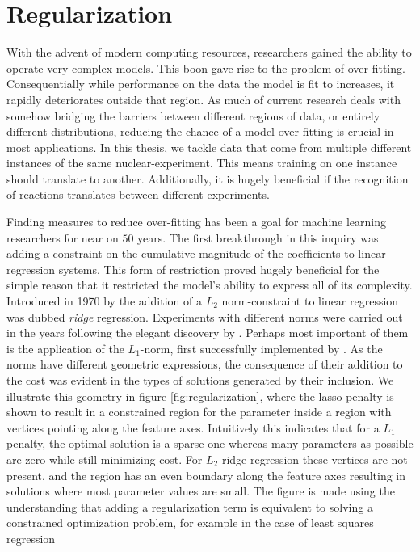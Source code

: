 \section{Regularization}\label{sec:regularization}

With the advent of modern computing resources, researchers gained the ability to operate very complex models. This boon gave rise to the problem of over-fitting. Consequentially while performance on the data the model is fit to increases, it rapidly deteriorates outside that region. As much of current research deals with somehow bridging the barriers between different regions of data, or entirely different distributions, reducing the chance of a model over-fitting is crucial in most applications. In this thesis, we tackle data that come from multiple different instances of the same nuclear-experiment. This means training on one instance should translate to another. Additionally, it is hugely beneficial if the recognition of reactions translates between different experiments.   

Finding measures to reduce over-fitting has been a goal for machine learning researchers for near on $50$ years. The first breakthrough in this inquiry was adding a constraint on the cumulative magnitude of the coefficients to linear regression systems. This form of restriction proved hugely beneficial for the simple reason that it restricted the model's ability to express all of its complexity. Introduced in 1970 by \citet{Hoerl1970} the addition of a $L_2$ norm-constraint to linear regression was dubbed \textit{ridge} regression. Experiments with different norms were carried out in the years following the elegant discovery by \citet{Hoerl1970}. Perhaps most important of them is the application of the $L_1$-norm, first successfully implemented by \citet{Tibshirani1996}. As the norms have different geometric expressions, the consequence of their addition to the cost was evident in the types of solutions generated by their inclusion. We illustrate this geometry in figure \ref{fig:regularization}, where the lasso penalty is shown to result in a constrained region for the parameter inside a region with vertices pointing along the feature axes. Intuitively this indicates that for a $L_1$ penalty, the optimal solution is a sparse one whereas many parameters as possible are zero while still minimizing cost. For $L_2$ ridge regression these vertices are not present, and the region has an even boundary along the feature axes resulting in solutions where most parameter values are small. The figure is made using the understanding that adding a regularization term is equivalent to solving a constrained optimization problem, for example in the case of least squares regression 


